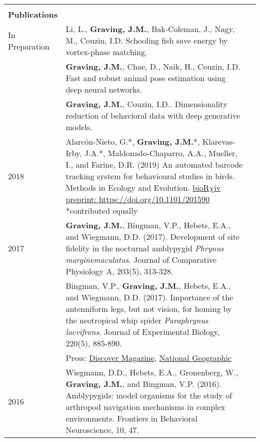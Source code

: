 \documentclass[letterpaper,10pt,oneside]{article}
\begin{document}
\begin{longtable}{@{} l p{5.3in}l}
     & \\
 \Large{\textbf{Publications}}  \vspace{5mm} \\
\large{In Preparation}
& Li, L., \textbf{Graving, J.M.}, Bak-Coleman, J., Nagy, M., Couzin, I.D. Schooling fish save energy by vortex-phase matching. \\
& \textbf{Graving, J.M.}, Chae, D., Naik, H., Couzin, I.D. Fast and robust animal pose estimation using deep neural networks.  \vspace{1mm} \\
& \textbf{Graving, J.M.}, Couzin, I.D..  Dimensionality reduction of behavioral data with deep generative models. \vspace{1mm} \\
\large{2018}
& Alarc\'{o}n-Nieto, G.*, \textbf{Graving, J.M.}*, Klarevas-Irby, J.A.*, Maldonado-Chaparro, A.A., Mueller, I., and Farine, D.R. (2019) An automated barcode tracking system for behavioural studies in birds. Methods in Ecology and Evolution. \href{https://doi.org/10.1101/201590}{bioR$\chi$iv preprint: https://doi.org/10.1101/201590}  \small{*contributed equally}  \vspace{1mm} \\
\large{2017}
& \textbf{Graving, J.M.}, Bingman, V.P., Hebets, E.A., and Wiegmann, D.D. (2017). Development of site fidelity in the nocturnal amblypygid \textit{Phrynus marginemaculatus}. Journal of Comparative Physiology A, 203(5), 313-328. \vspace{1mm} \\
& Bingman, V.P., \textbf{Graving, J.M.}, Hebets, E.A., and Wiegmann, D.D. (2017). Importance of the antenniform legs, but not vision, for homing by the neotropical whip spider \textit{Paraphrynus laevifrons}. Journal of Experimental Biology, 220(5), 885-890.  \\
&Press: \href{http://blogs.discovermagazine.com/inkfish/2017/01/24/whip-spiders-use-their-feet-to-smell-their-way-home}{Discover Magazine}, 
\href{https://www.youtube.com/watch?v=eUoFegXxmfo}{National Geographic} \vspace{1mm} \\
\large{2016}
& Wiegmann, D.D., Hebets, E.A., Gronenberg, W., \textbf{Graving, J.M.}, and Bingman, V.P. (2016). Amblypygids: model organisms for the study of arthropod navigation mechanisms in complex environments. Frontiers in Behavioral Neuroscience, 10, 47. \vspace{1mm} \\   


\end{longtable}
\end{document}
